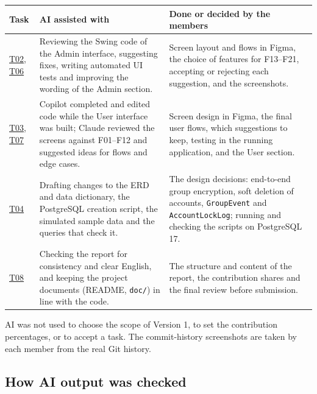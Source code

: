 \begin{center}
\small
\setlength{\tabcolsep}{4pt}
\label{tab:ai-by-task}
\begin{tabularx}{\textwidth}{|C{1.4cm}|Y|Y|}
  \hline
  \textbf{Task} & \textbf{AI assisted with} & \textbf{Done or decided by the members}\\
  \hline
  \hyperlink{T02}{T02}, \hyperlink{T06}{T06} &
  Reviewing the Swing code of the Admin interface, suggesting fixes, writing
  automated UI tests and improving the wording of the Admin section. &
  Screen layout and flows in Figma, the choice of features for F13--F21,
  accepting or rejecting each suggestion, and the screenshots.\\
  \hline
  \hyperlink{T03}{T03}, \hyperlink{T07}{T07} &
  Copilot completed and edited code while the User interface was built;
  Claude reviewed the screens against F01--F12 and suggested ideas for flows
  and edge cases. &
  Screen design in Figma, the final user flows, which suggestions to keep,
  testing in the running application, and the User section.\\
  \hline
  \hyperlink{T04}{T04} &
  Drafting changes to the ERD and data dictionary, the PostgreSQL creation
  script, the simulated sample data and the queries that check it. &
  The design decisions: end-to-end group encryption, soft deletion of
  accounts, \texttt{GroupEvent} and \texttt{AccountLockLog}; running and
  checking the scripts on PostgreSQL 17.\\
  \hline
  \hyperlink{T08}{T08} &
  Checking the report for consistency and clear English, and keeping the
  project documents (README, \texttt{doc/}) in line with the code. &
  The structure and content of the report, the contribution shares and the
  final review before submission.\\
  \hline
\end{tabularx}
\end{center}

AI was not used to choose the scope of Version 1, to set the contribution
percentages, or to accept a task. The commit-history screenshots are taken by
each member from the real Git history.

\subsection{How AI output was checked}

